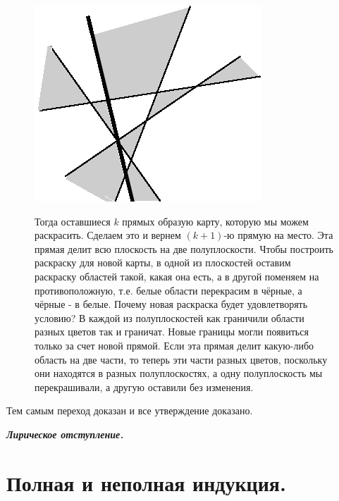 \begin{prf}
\begin{figure}[H]
\begin{minipage}{0.25\linewidth}
    \includegraphics[width=0.95\columnwidth]{img/figura 6.0 2.png}
\end{minipage}
\hfill
\begin{minipage}{0.69\linewidth}\setlength{\parindent}{1.5em}
Тогда оставшиеся $k$ прямых образую карту, которую мы можем раскрасить. Сделаем это и вернем $(k + 1)$-ю прямую на место. Эта прямая делит всю плоскость на две полуплоскости. Чтобы построить раскраску для новой карты, в одной из плоскостей оставим раскраску областей такой, какая она есть, а в другой поменяем на противоположную, т.е. белые области перекрасим в чёрные, а чёрные - в белые. Почему новая раскраска будет удовлетворять условию? В каждой из полуплоскостей как граничили области разных цветов так и граничат. Новые границы могли появиться только за счет новой прямой. Если эта прямая делит какую-либо область на две части, то теперь эти части разных цветов, поскольку они находятся в разных полуплоскостях, а одну полуплоскость мы перекрашивали, а другую оставили без изменения.
\end{minipage}
\end{figure} 
\par
Тем самым переход доказан и все утверждение доказано. \end{prf}

\newpage

\begin{center}
    \textit{\textbf{Лирическое отступление.}}
\end{center}

\section*{Полная и неполная индукция.}

